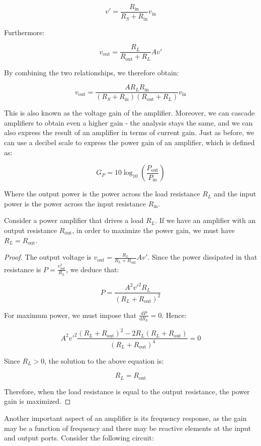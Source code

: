 \documentclass{article}
\begin{document}
\[ v' = \frac{R_{\text{in}}}{R_S + R_{\text{in}}}v_{\text{in}} \]

Furthermore:

\[ v_{\text{out}} = \frac{R_L}{R_{\text{out}} + R_L}Av' \]

By combining the two relationships, we therefore obtain:

\[ v_{\text{out}} = \frac{AR_LR_{\text{in}}}{(R_S + R_{\text{in}})(R_{\text{out}} + R_L)}v_{\text{in}} \]

This is also known as the voltage gain of the amplifier. Moreover, we can cascade amplifiers to obtain even a higher gain - the analysis stays the same, and we can also express the result of an amplifier in terms of current gain. Just as before, we can use a decibel scale to express the power gain of an amplifier, which is defined as:

\[ G_P = 10\log_{10}\left(\frac{P_{\text{out}}}{P_{\text{in}}}\right) \]

Where the output power is the power across the load resistance $R_L$ and the input power is the power across the input resistance $R_{\text{in}}$.

\begin{proposition}
    Consider a power amplifier that drives a load $R_L$. If we have an amplifier with an output resistance $R_{\text{out}}$, in order to maximize the power gain, we must have $R_L = R_{\text{out}}$.
\end{proposition}

\begin{proof}
    The output voltage is $v_{\text{out}} = \frac{R_L}{R_L + R_{\text{out}}}Av'$. Since the power dissipated in that resistance is $P = \frac{v_{\text{out}}^2}{R_L}$, we deduce that:

    \[ P = \frac{A^2v'^2R_L}{(R_L + R_{\text{out}})^2} \]

    For maximum power, we must impose that $\frac{dP}{dR_L} = 0$. Hence:

    \[ A^2v'^2 \frac{(R_L + R_{\text{out}})^2 - 2R_L(R_L + R_{\text{out}})}{(R_L + R_{\text{out}})^4} = 0 \]

    Since $R_L > 0$, the solution to the above equation is:

    \[ R_L = R_{\text{out}} \]

    Therefore, when the load resistance is equal to the output resistance, the power gain is maximized.
\end{proof}

Another important aspect of an amplifier is its frequency response, as the gain may be a function of frequency and there may be reactive elements at the input and output ports. Consider the following circuit:
\end{document}
